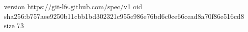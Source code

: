 version https://git-lfs.github.com/spec/v1
oid sha256:b757aee9250b11cbb1bd302321c955e986e76bd6c0ce66cead8a70f86e516cd8
size 73
